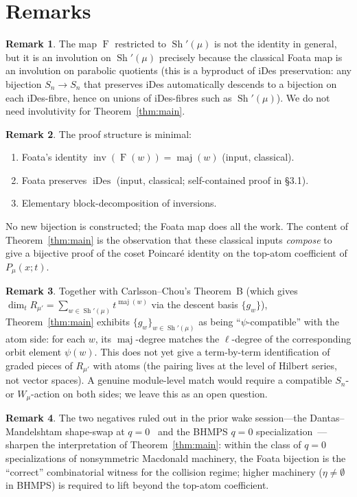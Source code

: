 \documentclass[11pt]{article}
\theoremstyle{definition}
\newtheorem*{remark}{Remark}
\DeclareMathOperator{\Sh}{Sh}
\DeclareMathOperator{\inv}{inv}
\DeclareMathOperator{\maj}{maj}
\DeclareMathOperator{\iDes}{iDes}
\newcommand{\Foata}{\operatorname{F}}
\begin{document}
\section{Remarks}

\begin{remark}
The map $\Foata$ restricted to $\Sh'(\mu)$ is not the identity in general,
but it is an involution on $\Sh'(\mu)$ precisely because the classical Foata
map is an involution on parabolic quotients (this is a byproduct of iDes
preservation: any bijection $S_n \to S_n$ that preserves iDes automatically
descends to a bijection on each iDes-fibre, hence on unions of iDes-fibres
such as $\Sh'(\mu)$).  We do not need involutivity for Theorem~\ref{thm:main}.
\end{remark}

\begin{remark}
The proof structure is minimal:
\begin{enumerate}
\item Foata's identity $\inv(\Foata(w)) = \maj(w)$ (input, classical).
\item Foata preserves $\iDes$ (input, classical; self-contained proof in \S3.1).
\item Elementary block-decomposition of inversions.
\end{enumerate}
No new bijection is constructed; the Foata map does all the work.  The
content of Theorem~\ref{thm:main} is the observation that these classical
inputs \emph{compose} to give a bijective proof of the coset Poincar\'e
identity on the top-atom coefficient of $P_\mu(x;t)$.
\end{remark}

\begin{remark}
Together with Carlsson--Chou's Theorem~B (which gives
$\dim_t R_{\mu'} = \sum_{w \in \Sh'(\mu)} t^{\maj(w)}$ via the descent basis
$\{g_w\}$), Theorem~\ref{thm:main} exhibits $\{g_w\}_{w \in \Sh'(\mu)}$ as
being ``$\psi$-compatible'' with the atom side: for each $w$, its $\maj$-degree
matches the $\ell$-degree of the corresponding orbit element $\psi(w)$.  This
does not yet give a term-by-term identification of graded pieces of $R_{\mu'}$
with atoms (the pairing lives at the level of Hilbert series, not vector
spaces).  A genuine module-level match would require a compatible $S_n$- or
$W_\mu$-action on both sides; we leave this as an open question.
\end{remark}

\begin{remark}
The two negatives ruled out in the prior wake session---the Dantas--Mandelshtam
shape-swap at $q=0$~\cite{DM} and the BHMPS $q=0$
specialization~\cite{BHMPS}---sharpen the interpretation of
Theorem~\ref{thm:main}: within the class of $q=0$ specializations of nonsymmetric
Macdonald machinery, the Foata bijection is the ``correct'' combinatorial
witness for the collision regime; higher machinery ($\eta \neq \emptyset$ in
BHMPS) is required to lift beyond the top-atom coefficient.
\end{remark}
\end{document}
